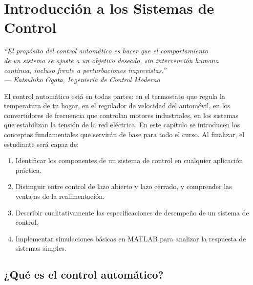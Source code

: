 
\chapter{Introducción a los Sistemas de Control}
\label{ch:introduccion}

\begin{flushright}
  \itshape
  ``El propósito del control automático es hacer que el comportamiento\\
  de un sistema se ajuste a un objetivo deseado, sin intervención humana\\
  continua, incluso frente a perturbaciones imprevistas.''\\[2pt]
  \normalfont\small --- Katsuhiko Ogata, \textit{Ingeniería de Control Moderna}
\end{flushright}

\bigskip

El control automático está en todas partes: en el termostato que regula la
temperatura de tu hogar, en el regulador de velocidad del automóvil, en
los convertidores de frecuencia que controlan motores industriales, en los
sistemas que estabilizan la tensión de la red eléctrica.
En este capítulo se introducen los conceptos fundamentales que servirán
de base para todo el curso. Al finalizar, el estudiante será capaz de:
\begin{enumerate}
  \item Identificar los componentes de un sistema de control en cualquier
        aplicación práctica.
  \item Distinguir entre control de lazo abierto y lazo cerrado, y comprender
        las ventajas de la realimentación.
  \item Describir cualitativamente las especificaciones de desempeño de un
        sistema de control.
  \item Implementar simulaciones básicas en MATLAB para analizar la respuesta
        de sistemas simples.
\end{enumerate}

\section{¿Qué es el control automático?}
\label{sec:intro-definicion}

